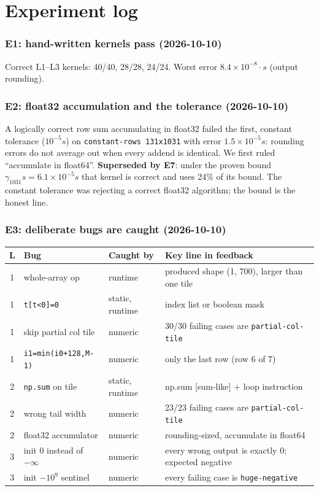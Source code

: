 \documentclass[11pt]{article}
\newcommand{\code}[1]{\texttt{#1}}
\newcommand{\entry}[2]{\subsubsection*{#1 \textnormal{\small(#2)}}}
\begin{document}
\section{Experiment log}
\label{sec:exp}

\entry{E1: hand-written kernels pass}{2026-10-10}
Correct L1--L3 kernels: 40/40, 28/28, 24/24. Worst error $8.4\times10^{-8}\cdot s$
(output rounding).

\entry{E2: float32 accumulation and the tolerance}{2026-10-10}
A logically correct row sum accumulating in float32 failed the first, constant tolerance
($10^{-5}s$) on \code{constant-rows 131x1031} with error $1.5\times10^{-5}s$: rounding errors do
not average out when every addend is identical. We first ruled ``accumulate in float64''.
\textbf{Superseded by E7}: under the proven bound $\gamma_{1031}s = 6.1\times10^{-5}s$ that kernel
is correct and uses 24\% of its bound. The constant tolerance was rejecting a correct float32
algorithm; the bound is the honest line.

\entry{E3: deliberate bugs are caught}{2026-10-10}
{\small
\begin{tabularx}{\linewidth}{@{}c>{\raggedright\arraybackslash}p{3.4cm}>{\raggedright\arraybackslash}p{2.1cm}Y@{}}
\toprule
L & Bug & Caught by & Key line in feedback \\
 & whole-array op & runtime & produced shape (1, 700), larger than one tile \\
1 & \code{t[t<0]=0} & static, runtime & index list or boolean mask \\
1 & skip partial col tile & numeric & 30/30 failing cases are \code{partial-col-tile} \\
1 & \code{i1=min(i0+128,M-1)} & numeric & only the last row (row 6 of 7) \\
2 & \code{np.sum} on tile & static, runtime & np.sum [sum-like] + loop instruction \\
2 & wrong tail width & numeric & 23/23 failing cases are \code{partial-col-tile} \\
2 & float32 accumulator & numeric & rounding-sized, accumulate in float64 \\
3 & init 0 instead of $-\infty$ & numeric & every wrong output is exactly 0; expected negative \\
3 & init $-10^9$ sentinel & numeric & every failing case is \code{huge-negative} \\
\bottomrule
\end{tabularx}}
\end{document}
